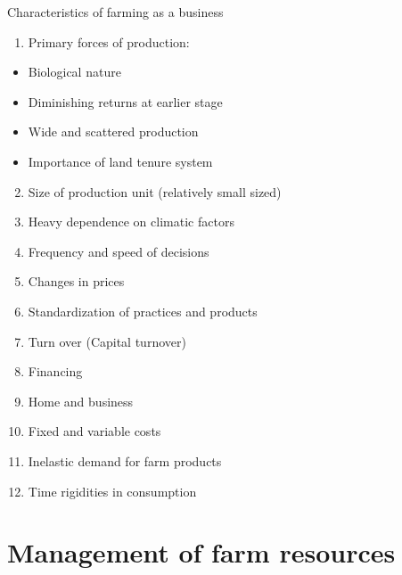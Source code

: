 \documentclass[12pt,ignorenonframetext,aspectratio=169]{beamer}
\providecommand{\tightlist}{%
  \setlength{\itemsep}{0pt}\setlength{\parskip}{0pt}}
\begin{document}
\begin{frame}{Characteristics of farming as a business}
\protect\hypertarget{characteristics-of-farming-as-a-business}{}
\footnotesize

\begin{enumerate}
\tightlist
\item
  Primary forces of production:
\end{enumerate}

\begin{itemize}
\tightlist
\item
  Biological nature
\item
  Diminishing returns at earlier stage
\item
  Wide and scattered production
\item
  Importance of land tenure system
\end{itemize}

\begin{enumerate}
\setcounter{enumi}{1}
\tightlist
\item
  Size of production unit (relatively small sized)
\item
  Heavy dependence on climatic factors
\item
  Frequency and speed of decisions
\item
  Changes in prices
\item
  Standardization of practices and products
\item
  Turn over (Capital turnover)
\item
  Financing
\item
  Home and business
\item
  Fixed and variable costs
\item
  Inelastic demand for farm products
\item
  Time rigidities in consumption
\end{enumerate}
\end{frame}

\hypertarget{management-of-farm-resources}{%
\section{Management of farm
resources}\label{management-of-farm-resources}}

\hypertarget{section-2}{%
\subsection{}\label{section-2}}
\end{document}
